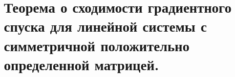 \section{Теорема о сходимости градиентного спуска для линейной системы с симметричной положительно определенной матрицей.}